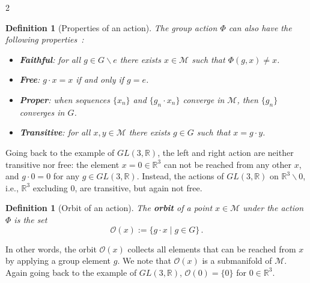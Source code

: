 \documentclass{article}
\newtheorem{definition}[theorem]{Definition}
\newcommand{\M}{\mathcal{M}}                                %
\newcommand{\R}{\mathbb{R}}                                 %
\newcommand{\state}{x}
\newcommand{\stateb}{y}
\newcommand{\appstate}{\bar{x}}
\begin{document}
\begin{multicols}{2}
\begin{definition}[Properties of an action]\label{def:properties_of_action}
    The group action $\Phi$ can also have the following properties~\cite{Holm2009}:
    \begin{itemize}
        \item \textbf{Faithful}: for all $g \in G\backslash e$ there exists $\state \in \M$ such that $\Phi(g,\state) \neq \state$.
        \item \textbf{Free}: $g \cdot\state = \state$ if and only if $g = e$. %
        \item \textbf{Proper}: when sequences $\{\state_n\}$ and $\{g_n\cdot\state_n\}$ converge in $\M$, then $\{g_n\}$ converges in $G$. 
        \item \textbf{Transitive}: for all $\state,\stateb \in \M$ there exists $g \in G$ such that $\state = g \cdot \stateb$. %
    \end{itemize}
\end{definition}

Going back to the example of $GL(3,\R)$, the left and right action are neither transitive nor free: the element $x = 0 \in \R^3$ can not be reached from any other $x$, and $g \cdot 0 = 0$ for any $g \in GL(3,\R)$. Instead, the actions of $GL(3,\R)$ on $\R^3 \backslash 0$, i.e., $\R^3$ excluding $0$, are transitive, but again not free. 


\begin{definition}[Orbit of an action]\label{def:orbit}
    The \textbf{orbit} of a point $\state \in \M$ under the action $\Phi$ is the set
    \begin{equation}
        \mathcal{O}(\state) := \{ g \cdot \state \;|\; g \in G \} \,. %
    \end{equation}
\end{definition}

In other words, the orbit $\mathcal{O}(\state)$ collects all elements that can be reached from $\state$ by applying a group element $g$. We note that $\mathcal{O}(\state)$ is a submanifold of $\M$. Again going back to the example of $GL(3,\R)$, $\mathcal{O}(0) = \{0\}$ for $0 \in \R^3$.



\end{multicols}
\end{document}

